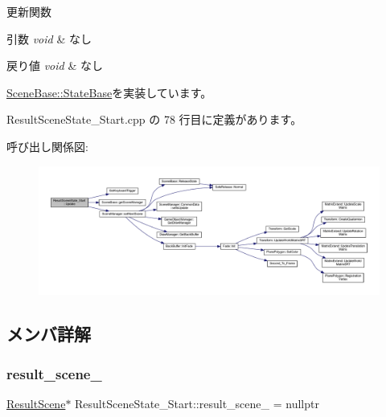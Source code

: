 更新関数 


\begin{DoxyParams}{引数}
{\em void} & なし \\
\hline
\end{DoxyParams}

\begin{DoxyRetVals}{戻り値}
{\em void} & なし \\
\hline
\end{DoxyRetVals}


\mbox{\hyperlink{class_scene_base_1_1_state_base_ad2c6c8fd9f020eb02f64f394edee129c}{Scene\+Base\+::\+State\+Base}}を実装しています。



 Result\+Scene\+State\+\_\+\+Start.\+cpp の 78 行目に定義があります。

呼び出し関係図\+:
\nopagebreak
\begin{figure}[H]
\begin{center}
\leavevmode
\includegraphics[width=350pt]{class_result_scene_state___start_a2ecdef2bef0cd1a04055e8687e11199b_cgraph}
\end{center}
\end{figure}


\subsection{メンバ詳解}
\mbox{\label{class_result_scene_state___start_a223a52e93231e460dad3401a1a49931d}} 
\subsubsection{\texorpdfstring{result\+\_\+scene\+\_\+}{result\_scene\_}}
{\footnotesize\ttfamily \mbox{\hyperlink{class_result_scene}{Result\+Scene}}$\ast$ Result\+Scene\+State\+\_\+\+Start\+::result\+\_\+scene\+\_\+ = nullptr\hspace{0.3cm}{\ttfamily [protected]}}



